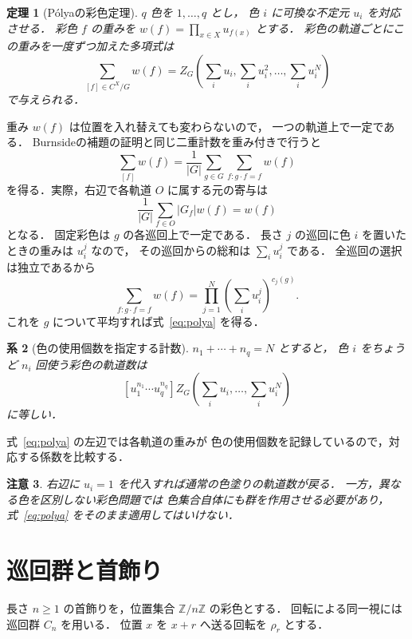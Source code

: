 \documentclass[a5paper,10pt,onecolumn]{jsarticle}
\makeatletter
\theoremstyle{mathnotetheorem}
\newtheorem{theorem}{定理}[section]
\newtheorem{corollary}[theorem]{系}
\newtheorem{remark}[theorem]{注意}
\renewcommand{\proofname}{証明}
\renewenvironment{proof}[1][\proofname]{%
  \par\pushQED{\qed}\normalfont\topsep4\p@\@plus2\p@\relax
  \trivlist\item[\hskip\labelsep\bfseries #1]\ignorespaces
}{\popQED\endtrivlist\@endpefalse}
\makeatother
\begin{document}
\begin{theorem}[P\'olyaの彩色定理]\label{thm:polya}
$q$ 色を $1,\ldots,q$ とし，
色 $i$ に可換な不定元 $u_i$ を対応させる．
彩色 $f$ の重みを
$w(f)=\prod_{x\in X}u_{f(x)}$ とする．
彩色の軌道ごとにこの重みを一度ずつ加えた多項式は
\begin{equation}\label{eq:polya}
 \sum_{[f]\in C^X/G}w(f)
 =Z_G\!\left(\sum_i u_i,\sum_i u_i^2,
 \ldots,\sum_i u_i^N\right)
\end{equation}
で与えられる．
\end{theorem}
\begin{proof}
重み $w(f)$ は位置を入れ替えても変わらないので，
一つの軌道上で一定である．
Burnsideの補題の証明と同じ二重計数を重み付きで行うと
\[
 \sum_{[f]}w(f)
 =\frac1{|G|}\sum_{g\in G}
  \sum_{f:g\cdot f=f}w(f)
\]
を得る．実際，右辺で各軌道 $O$ に属する元の寄与は
\[
 \frac1{|G|}\sum_{f\in O}|G_f|w(f)=w(f)
\]
となる．
固定彩色は $g$ の各巡回上で一定である．
長さ $j$ の巡回に色 $i$ を置いたときの重みは $u_i^j$ なので，
その巡回からの総和は $\sum_i u_i^j$ である．
全巡回の選択は独立であるから
\[
 \sum_{f:g\cdot f=f}w(f)
 =\prod_{j=1}^N\left(\sum_i u_i^j\right)^{c_j(g)}.
\]
これを $g$ について平均すれば式~\eqref{eq:polya} を得る．
\end{proof}

\begin{corollary}[色の使用個数を指定する計数]
$n_1+\cdots+n_q=N$ とすると，
色 $i$ をちょうど $n_i$ 回使う彩色の軌道数は
\[
 [u_1^{n_1}\cdots u_q^{n_q}]
 Z_G\!\left(\sum_i u_i,\ldots,\sum_i u_i^N\right)
\]
に等しい．
\end{corollary}
\begin{proof}
式~\eqref{eq:polya} の左辺では各軌道の重みが
色の使用個数を記録しているので，対応する係数を比較する．
\end{proof}

\begin{remark}
右辺に $u_i=1$ を代入すれば通常の色塗りの軌道数が戻る．
一方，異なる色を区別しない彩色問題では
色集合自体にも群を作用させる必要があり，
式~\eqref{eq:polya} をそのまま適用してはいけない．
\end{remark}

\section{巡回群と首飾り}
長さ $n\ge1$ の首飾りを，位置集合
$\mathbb Z/n\mathbb Z$ の彩色とする．
回転による同一視には巡回群 $C_n$ を用いる．
位置 $x$ を $x+r$ へ送る回転を $\rho_r$ とする．
\end{document}
